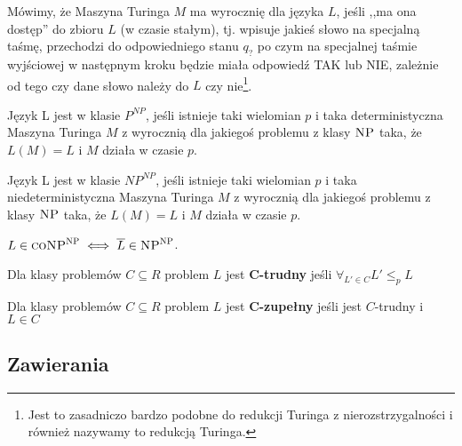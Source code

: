 \begin{definition}
    Mówimy, że Maszyna Turinga \(M\) ma wyrocznię dla języka \(L\), jeśli ,,ma ona dostęp'' do zbioru \(L\) (w czasie stałym), tj. wpisuje jakieś słowo na specjalną taśmę, przechodzi do odpowiedniego stanu \(q_?\) po czym na specjalnej taśmie wyjściowej w następnym kroku będzie miała odpowiedź \textsc{TAK} lub \textsc{NIE}, zależnie od tego czy dane słowo należy do \(L\) czy nie\footnote{Jest to zasadniczo bardzo podobne do redukcji Turinga z nierozstrzygalności i również nazywamy to redukcją Turinga.}.
\end{definition}

\begin{definition}
    Język L jest w klasie \(P^{NP}\), jeśli istnieje taki wielomian \(p\) i taka deterministyczna Maszyna Turinga \(M\) z wyrocznią dla jakiegoś problemu z klasy \(\np\) taka, że \(L(M) = L\) i \(M\) działa w czasie \(p\). 
\end{definition}

\begin{definition}
    Język L jest w klasie \(NP^{NP}\), jeśli istnieje taki wielomian \(p\) i taka niedeterministyczna Maszyna Turinga \(M\) z wyrocznią dla jakiegoś problemu z klasy \(\np\) taka, że \(L(M) = L\) i \(M\) działa w czasie \(p\). 
\end{definition}

\begin{definition}
        \(  L \in  \textsc{coNP}^\textsc{NP} \iff \complement{L} \in \textsc{NP}^\textsc{NP} \).
\end{definition}

\begin{definition}
    Dla klasy problemów \( C \subseteq R \) problem \( L \) jest \textbf{C-trudny} jeśli \( \forall_{L' \in C} L' \leq_p L \)
\end{definition}
\begin{definition}
    Dla klasy problemów \( C \subseteq R \) problem \( L \) jest \textbf{C-zupełny} jeśli jest \(C\)-trudny i \( L \in C \)
\end{definition}


\subsection{Zawierania} 

